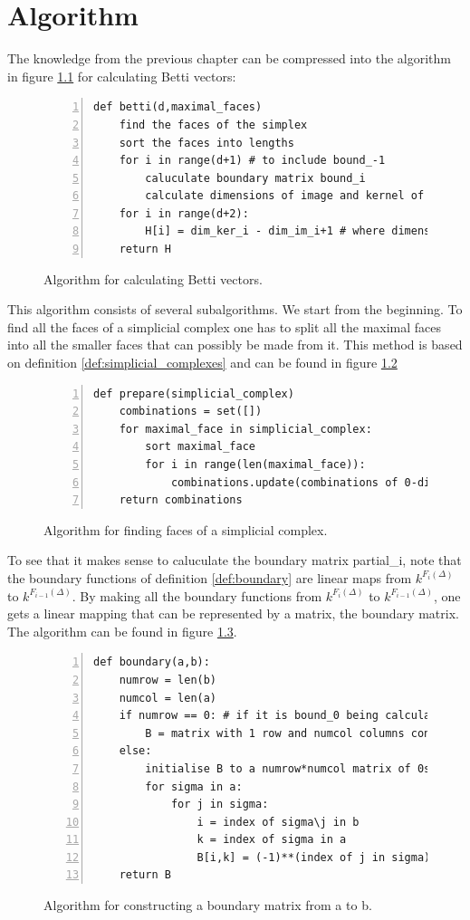 \documentclass[11pt,a4paper,twoside]{report}
\begin{document}
\chapter{Algorithm}\label{ch:algorithm}
The knowledge from the previous chapter can be compressed into the algorithm in figure \ref{fig:Algorithm} for calculating Betti vectors:
\begin{figure}[H]
\begin{lstlisting}[numbers=left]
def betti(d,maximal_faces)
    find the faces of the simplex 
    sort the faces into lengths
    for i in range(d+1) # to include bound_-1
        caluculate boundary matrix bound_i
        calculate dimensions of image and kernel of bound_i
    for i in range(d+2):
        H[i] = dim_ker_i - dim_im_i+1 # where dimensions are 0 if not calculated
    return H
\end{lstlisting}
\caption{Algorithm for calculating Betti vectors.}
\label{fig:Algorithm}
\end{figure}
This algorithm consists of several subalgorithms. We start from the beginning. To find all the faces of a simplicial complex one has to split all the maximal faces into all the smaller faces that can possibly be made from it. This method is based on definition \ref{def:simplicial_complexes} and can be found in figure \ref{fig:Algorithm_faces}
\begin{figure}[H]
\begin{lstlisting}[numbers=left]
def prepare(simplicial_complex)
    combinations = set([])
    for maximal_face in simplicial_complex:
    	sort maximal_face
        for i in range(len(maximal_face)):
            combinations.update(combinations of 0-dimensional faces in maximal_face of length i)
    return combinations    
\end{lstlisting}
\caption{Algorithm for finding faces of a simplicial complex.}
\label{fig:Algorithm_faces}
\end{figure}
To see that it makes sense to caluculate the boundary matrix partial\_i, note that the boundary functions of definition \ref{def:boundary} are linear maps from $k^{F_i(\Delta)}$ to $k^{F_{i-1}(\Delta)}$. By making all the boundary functions from $k^{F_i(\Delta)}$ to $k^{F_{i-1}(\Delta)}$, one gets a linear mapping that can be represented by a matrix, the boundary matrix. The algorithm can be found in figure \ref{fig:Algorithm_matrix}.
\begin{figure}[H]
\begin{lstlisting}[numbers=left]
def boundary(a,b):
    numrow = len(b)
    numcol = len(a)
    if numrow == 0: # if it is bound_0 being calculated
        B = matrix with 1 row and numcol columns consisting of 1s
    else:
        initialise B to a numrow*numcol matrix of 0s 
        for sigma in a:
            for j in sigma:
                i = index of sigma\j in b
                k = index of sigma in a
                B[i,k] = (-1)**(index of j in sigma) 
    return B
\end{lstlisting}
\caption{Algorithm for constructing a boundary matrix from a to b.}
\label{fig:Algorithm_matrix}
\end{figure}
\end{document}
